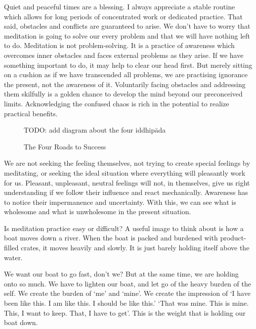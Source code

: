 \enlargethispage{\baselineskip}

Quiet and peaceful times are a blessing. I always appreciate a stable
routine which allows for long periods of concentrated work or dedicated
practice. That said, obstacles and conflicts are guaranteed to arise. We
don't have to worry that meditation is going to solve our every problem
and that we will have nothing left to do. Meditation is not
problem-solving. It is a practice of awareness which overcomes inner
obstacles and faces external problems as they arise. If we have
something important to do, it may help to clear our head first. But
merely sitting on a cushion as if we have transcended all problems, we
are practising ignorance the present, not the awareness of it.
Voluntarily facing obstacles and addressing them skilfully is a golden
chance to develop the mind beyond our preconceived limits. Acknowledging
the confused chaos is rich in the potential to realize practical
benefits.


\begin{figure}[h]
\caption{The Four Roads to Success}\label{fig-four-roads}

\centering
TODO: add diagram about the four iddhipāda


\end{figure}

\vfill\null
\clearpage

We are not seeking the feeling themselves, not trying to create special
feelings by meditating, or seeking the ideal situation where everything
will pleasantly work for us. Pleasant, unpleasant, neutral feelings will
not, in themselves, give us right understanding if we follow their
influence and react mechanically. Awareness has to notice their
impermanence and uncertainty. With this, we can see what is wholesome
and what is unwholesome in the present situation.


Is meditation practice easy or difficult? A useful image to think about
is how a boat moves down a river. When the boat is packed and burdened
with product-filled crates, it moves heavily and slowly. It is just
barely holding itself above the water.

We want our boat to go fast, don't we? But at the same time, we are
holding onto so much. We have to lighten our boat, and let go of the
heavy burden of the self. We create the burden of `me' and `mine'. We
create the impression of `I have been like this. I am like this. I
should be like this.' `That was mine. This is mine. This, I want to
keep. That, I have to get'. This is the weight that is holding our boat
down.

